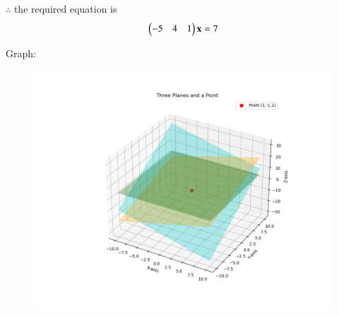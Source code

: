 \documentclass[journal,12pt,onecolumn]{IEEEtran}
\begin{document}
$\therefore$ the required equation is
\begin{align}
		\begin{pmatrix}-5&4&1\end{pmatrix}\mathbf{x} = 7
\end{align}
		

Graph:
\begin{figure}[H]
    \centering
    \includegraphics[scale=0.5]{plot}
    \caption{}
    \label{fig:plot}
\end{figure}
\end{document}
